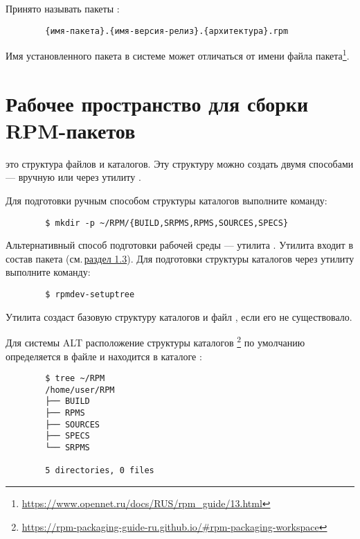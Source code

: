 Принято называть пакеты :
\begin{verbatim}
        {имя-пакета}.{имя-версия-релиз}.{архитектура}.rpm
\end{verbatim}


Имя установленного пакета в системе может отличаться от имени файла пакета\footnote{\href{https://www.opennet.ru/docs/RUS/rpm_guide/13.html}{https://www.opennet.ru/docs/RUS/rpm\_guide/13.html}}.

\hypertarget{3.4}{\section{Рабочее пространство для сборки RPM-пакетов}}
 это структура файлов и каталогов. Эту структуру
можно создать двумя способами --- вручную или через утилиту .

Для подготовки ручным способом структуры каталогов выполните команду:
\begin{verbatim}
        $ mkdir -p ~/RPM/{BUILD,SRPMS,RPMS,SOURCES,SPECS}
\end{verbatim}

Альтернативный способ подготовки рабочей среды --- утилита . Утилита входит в
состав пакета  (см.\,\hyperlink{1.3}{раздел 1.3}). Для подготовки структуры каталогов
через утилиту  выполните команду:
\begin{verbatim}
        $ rpmdev-setuptree
\end{verbatim}

Утилита создаст базовую структуру каталогов и файл , если его не существовало.

Для системы ALT расположение структуры каталогов%
\footnote{\href{https://rpm-packaging-guide-ru.github.io/\#rpm-packaging-workspace}{https://rpm-packaging-guide-ru.github.io/\#rpm-packaging-workspace}}
 по умолчанию определяется в файле  и находится в каталоге :
\begin{verbatim}
        $ tree ~/RPM
        /home/user/RPM
        ├── BUILD
        ├── RPMS
        ├── SOURCES
        ├── SPECS
        └── SRPMS

        5 directories, 0 files
\end{verbatim}

